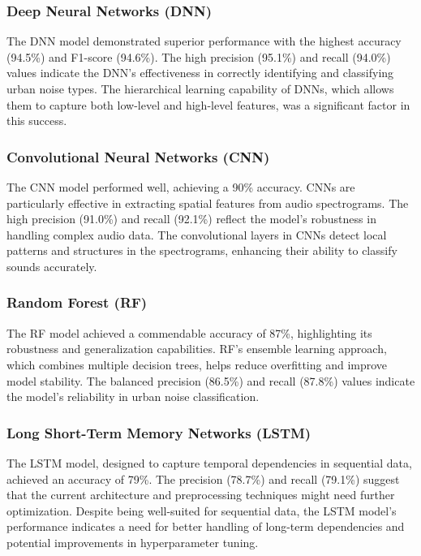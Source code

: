 \documentclass[conference]{IEEEtran}
\begin{document}
\subsubsection{Deep Neural Networks (DNN)}

The DNN model demonstrated superior performance with the highest accuracy (94.5\%) and F1-score (94.6\%). The high precision (95.1\%) and recall (94.0\%) values indicate the DNN's effectiveness in correctly identifying and classifying urban noise types. The hierarchical learning capability of DNNs, which allows them to capture both low-level and high-level features, was a significant factor in this success.

\subsubsection{Convolutional Neural Networks (CNN)}

The CNN model performed well, achieving a 90\% accuracy. CNNs are particularly effective in extracting spatial features from audio spectrograms. The high precision (91.0\%) and recall (92.1\%) reflect the model's robustness in handling complex audio data. The convolutional layers in CNNs detect local patterns and structures in the spectrograms, enhancing their ability to classify sounds accurately.

\subsubsection{Random Forest (RF)}

The RF model achieved a commendable accuracy of 87\%, highlighting its robustness and generalization capabilities. RF's ensemble learning approach, which combines multiple decision trees, helps reduce overfitting and improve model stability. The balanced precision (86.5\%) and recall (87.8\%) values indicate the model's reliability in urban noise classification.

\subsubsection{Long Short-Term Memory Networks (LSTM)}

The LSTM model, designed to capture temporal dependencies in sequential data, achieved an accuracy of 79\%. The precision (78.7\%) and recall (79.1\%) suggest that the current architecture and preprocessing techniques might need further optimization. Despite being well-suited for sequential data, the LSTM model's performance indicates a need for better handling of long-term dependencies and potential improvements in hyperparameter tuning.
\end{document}
